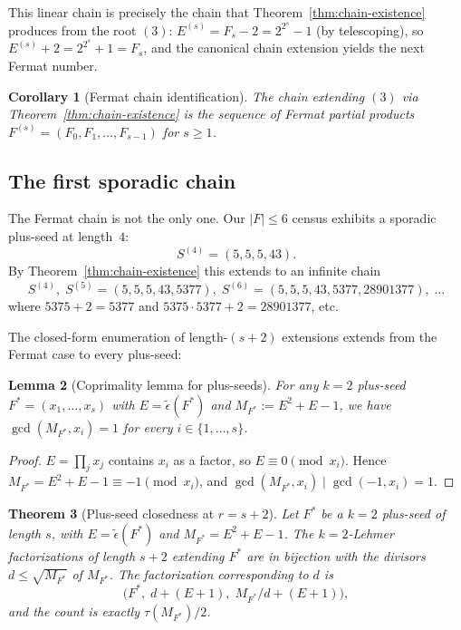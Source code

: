 \documentclass[11pt]{article}
\newtheorem{theorem}{Theorem}
\newtheorem{corollary}[theorem]{Corollary}
\newtheorem{lemma}[theorem]{Lemma}
\theoremstyle{definition}
\theoremstyle{remark}
\newcommand{\eps}{\tilde{\epsilon}}
\begin{document}
This linear chain is precisely the chain that
Theorem~\ref{thm:chain-existence} produces from the root $(3)$:
$E^{(s)} = F_s - 2 = 2^{2^s} - 1$ (by telescoping), so
$E^{(s)} + 2 = 2^{2^s} + 1 = F_s$, and the canonical chain extension
yields the next Fermat number.

\begin{corollary}[Fermat chain identification]\label{cor:fermat-chain}
The chain extending $(3)$ via Theorem~\ref{thm:chain-existence} is the
sequence of Fermat partial products $F^{(s)} = (F_0, F_1, \ldots,
F_{s-1})$ for $s \ge 1$.
\end{corollary}

\subsection{The first sporadic chain}

The Fermat chain is not the only one.  Our $|F| \le 6$ census exhibits
a sporadic plus-seed at length~$4$:
\[
  S^{(4)} = (5, 5, 5, 43).
\]
By Theorem~\ref{thm:chain-existence} this extends to an infinite
chain
\[
  S^{(4)},\;
  S^{(5)} = (5, 5, 5, 43, 5377),\;
  S^{(6)} = (5, 5, 5, 43, 5377, 28901377),\;
  \ldots
\]
where $5375 + 2 = 5377$ and $5375 \cdot 5377 + 2 = 28901377$, etc.

The closed-form enumeration of length-$(s+2)$ extensions extends
from the Fermat case to every plus-seed:

\begin{lemma}[Coprimality lemma for plus-seeds]\label{lem:coprime}
For any $k = 2$ plus-seed $F^* = (x_1, \ldots, x_s)$ with $E =
\eps(F^*)$ and $M_{F^*} := E^2 + E - 1$, we have
$\gcd(M_{F^*}, x_i) = 1$ for every $i \in \{1, \ldots, s\}$.
\end{lemma}

\begin{proof}
$E = \prod_j x_j$ contains $x_i$ as a factor, so $E \equiv 0
\pmod{x_i}$.  Hence $M_{F^*} = E^2 + E - 1 \equiv -1 \pmod{x_i}$, and
$\gcd(M_{F^*}, x_i) \mid \gcd(-1, x_i) = 1$.
\end{proof}

\begin{theorem}[Plus-seed closedness at $r = s + 2$]\label{thm:plus-seed-closure}
Let $F^*$ be a $k = 2$ plus-seed of length $s$, with $E =
\eps(F^*)$ and $M_{F^*} = E^2 + E - 1$.  The $k = 2$-Lehmer
factorizations of length $s + 2$ extending $F^*$ are in bijection
with the divisors $d \le \sqrt{M_{F^*}}$ of $M_{F^*}$.  The
factorization corresponding to $d$ is
\[
  \bigl(F^*,\; d + (E + 1),\; M_{F^*}/d + (E + 1)\bigr),
\]
and the count is exactly $\tau(M_{F^*}) / 2$.
\end{theorem}
\end{document}
